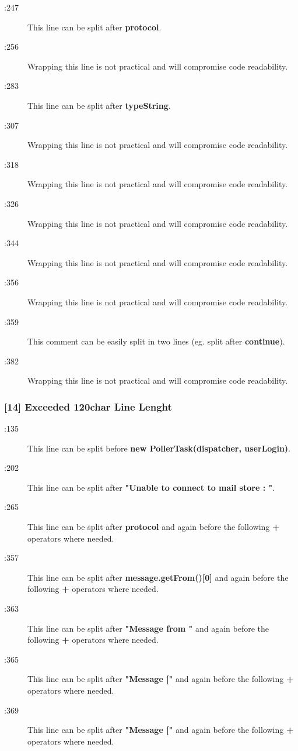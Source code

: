 \begin{description}
	\item[:247] This line can be split after \textbf{protocol}.
	\item[:256] Wrapping this line is not practical and will compromise code readability.
	\item[:283] This line can be split after \textbf{typeString}.
	\item[:307] Wrapping this line is not practical and will compromise code readability.
	\item[:318] Wrapping this line is not practical and will compromise code readability.
	\item[:326] Wrapping this line is not practical and will compromise code readability.
	\item[:344] Wrapping this line is not practical and will compromise code readability.
	\item[:356] Wrapping this line is not practical and will compromise code readability.
	\item[:359] This comment can be easily split in two lines (eg. split after \textbf{continue}).
	\item[:382] Wrapping this line is not practical and will compromise code readability.
\end{description}
\subsubsection{[14] Exceeded 120char Line Lenght}
\begin{description}
	\item[:135] This line can be split before \textbf{new PollerTask(dispatcher, userLogin)}.
	\item[:202] This line can be split after \textbf{"Unable to connect to mail store : "}.
	\item[:265] This line can be split after \textbf{protocol} and again before the following \textbf{+} operators where needed.
	\item[:357] This line can be split after \textbf{message.getFrom()[0]} and again before the following \textbf{+} operators where needed.
	\item[:363] This line can be split after \textbf{"Message from "} and again before the following \textbf{+} operators where needed.
	\item[:365] This line can be split after \textbf{"Message ["} and again before the following \textbf{+} operators where needed.
	\item[:369] This line can be split after \textbf{"Message ["} and again before the following \textbf{+} operators where needed.
\end{description}
